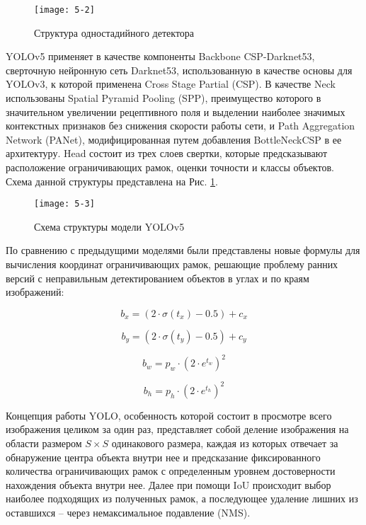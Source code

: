 \vspace{0.5cm}

\begin{figure}[ht]
    \centering
    \texttt{[image: 5-2]}
    \caption{Структура одностадийного детектора}
    \label{img:5-2}
\end{figure}

YOLOv5 \cite{5-4} применяет в качестве компоненты Backbone CSP-Darknet53, сверточную нейронную сеть Darknet53, использованную в качестве основы для YOLOv3, к которой применена Cross Stage Partial (CSP). В качестве Neck использованы Spatial Pyramid Pooling (SPP), преимущество которого в значительном увеличении рецептивного поля и выделении наиболее значимых контекстных признаков без снижения скорости работы сети, и Path Aggregation Network (PANet), модифицированная путем добавления BottleNeckCSP в ее архитектуру. Head состоит из трех слоев свертки, которые предсказывают расположение ограничивающих рамок, оценки точности и классы объектов. Схема данной структуры представлена на Рис. \ref{img:5-2}.

\begin{figure}[ht]
    \centering
    \texttt{[image: 5-3]}
    \caption{Схема структуры модели YOLOv5}
    \label{img:5-3}
\end{figure}

По сравнению с предыдущими моделями были представлены новые формулы для вычисления координат ограничивающих рамок, решающие проблему ранних версий с неправильным детектированием объектов в углах и по краям изображений:

\begin{equation}
    b_x = (2 \cdot \sigma(t_x) - 0.5) + c_x
\end{equation}

\begin{equation}
    b_y = (2 \cdot \sigma(t_y) - 0.5) + c_y
\end{equation}

\begin{equation}
    b_w = p_w \cdot (2 \cdot e^{t_w})^2
\end{equation}

\begin{equation}
    b_h = p_h \cdot (2 \cdot e^{t_h})^2
\end{equation}

\vspace{0.5cm}

Концепция работы YOLO, особенность которой состоит в просмотре всего изображения целиком за один раз, представляет собой деление изображения на области размером $S \times S$ одинакового размера, каждая из которых отвечает за обнаружение центра объекта внутри нее и предсказание фиксированного количества ограничивающих рамок с определенным уровнем достоверности нахождения объекта внутри нее. Далее при помощи IoU происходит выбор наиболее подходящих из полученных рамок, а последующее удаление лишних из оставшихся -- через немаксимальное подавление (NMS).
